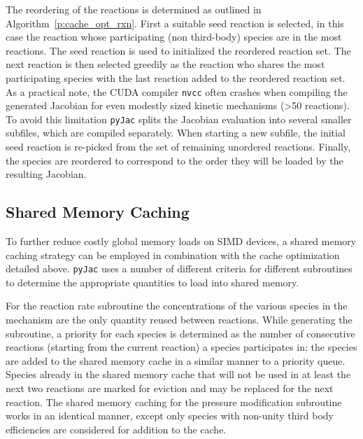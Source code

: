 \documentclass[preprint,12pt]{elsarticle}
\begin{document}
{The reordering of the reactions is determined as outlined in Algorithm~\eqref{p:cache_opt_rxn}.
First a suitable seed reaction is selected, in this case the reaction whose participating (non third-body) species are in the most reactions.
The seed reaction is used to initialized the reordered reaction set.
The next reaction is then selected greedily as the reaction who shares the most participating species with the last reaction added to the reordered reaction set.
As a practical note, the CUDA compiler \texttt{nvcc} often crashes when compiling the generated Jacobian for even modestly sized kinetic mechanisms (>50 reactions).
To avoid this limitation \texttt{pyJac} splits the Jacobian evaluation into several smaller subfiles, which are compiled separately.
When starting a new subfile, the initial seed reaction is re-picked from the set of remaining unordered reactions.
Finally, the species are reordered to correspond to the order they will be loaded by the resulting Jacobian.

\subsection{Shared Memory Caching}
To further reduce costly global memory loads on SIMD devices, a shared memory caching strategy can be employed in combination with the cache optimization detailed above.
\texttt{pyJac} uses a number of different criteria for different subroutines to determine the appropriate quantities to load into shared memory.

For the reaction rate subroutine the concentrations of the various species in the mechanism are the only quantity reused between reactions.
While generating the subroutine, a priority for each species is determined as the number of consecutive reactions (starting from the current reaction) a species participates in; the species are added to the shared memory cache in a similar manner to a priority queue.
Species already in the shared memory cache that will not be used in at least the next two reactions are marked for eviction and may be replaced for the next reaction.
The shared memory caching for the pressure modification subroutine works in an identical manner, except only species with non-unity third body efficiencies are considered for addition to the cache.

}
\end{document}
